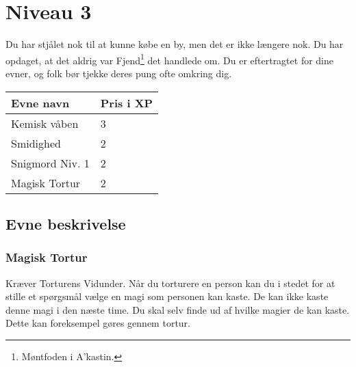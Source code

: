 \chapter{Niveau 3}
Du har stjålet nok til at kunne købe en by, men det er ikke længere nok. Du har opdaget, at det aldrig var Fjend\footnote{Møntfoden i A'kastin.} det handlede om. Du er eftertragtet for dine evner, og folk bør tjekke deres pung ofte omkring dig. 
\begin{table}[H]
    \centering
    \begin{tabular}{|p{}|p{}|}
    \rowcolor{cerulean!80}\hline
        Evne navn & Pris i XP \\\hline
        Kemisk våben & 3\\\hline
        Smidighed & 2\\\hline
        Snigmord Niv. 1 & 2\\\hline
        Magisk Tortur & 2 \\\hline
    \end{tabular}
\end{table}
\section{Evne beskrivelse}







\subsection{Magisk Tortur}
Kræver Torturens Vidunder. Når du torturere en person kan du i stedet for at stille et spørgsmål vælge en magi som personen kan kaste. De kan ikke kaste denne magi i den næste time. Du skal selv finde ud af hvilke magier de kan kaste. Dette kan foreksempel gøres gennem tortur.